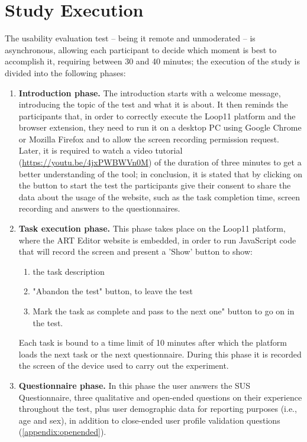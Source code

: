 \section{Study Execution}
\label{sec:evaluation-execution}

The usability evaluation test -- being it remote and unmoderated -- is asynchronous, allowing each participant to decide which moment is best to accomplish it, requiring between 30 and 40 minutes; the execution of the study is divided into the following phases:
\begin{enumerate}
    \item \textbf{Introduction phase.} The introduction starts with a welcome message, introducing the topic of the test and what it is about. It then reminds the participants that, in order to correctly execute the Loop11 platform and the browser extension, they need to run it on a desktop PC using Google Chrome or Mozilla Firefox and to allow the screen recording permission request. Later, it is required to watch a video tutorial (\url{https://youtu.be/4jxPWBWVn0M}) of the duration of three minutes to get a better understanding of the tool; in conclusion, it is stated that by clicking on the button to start the test the participants give their consent to share the data about the usage of the website, such as the task completion time, screen recording and answers to the questionnaires.
    \item \textbf{Task execution phase.} This phase takes place on the Loop11 platform, where the ART Editor website is embedded, in order to run JavaScript code that will record the screen and present a ’Show’ button to show:
        \begin{enumerate}
            \item the task description
            \item "Abandon the test" button, to leave the test
            \item Mark the task as complete and pass to the next one" button to go on in the test.
        \end{enumerate}
    Each task is bound to a time limit of 10 minutes after which the platform loads the next task or the next questionnaire. During this phase it is recorded the screen of the device used to carry out the experiment.
    \item \textbf{Questionnaire phase.} In this phase the user answers the \gls{SUS} Questionnaire, three qualitative and open-ended questions on their experience throughout the test, plus user demographic data for reporting purposes (i.e., age and sex), in addition to close-ended user profile validation questions (\autoref{appendix:openended}).
\end{enumerate}